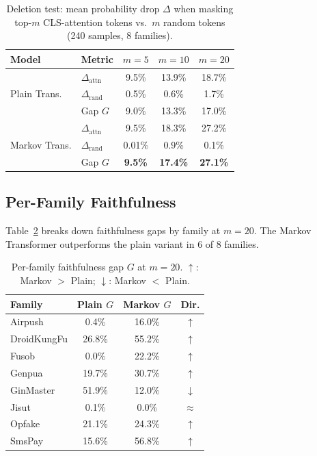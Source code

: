 \documentclass[12pt]{article}
\begin{document}
\begin{table}[t]
\centering
\caption{Deletion test: mean probability drop $\Delta$ when masking top-$m$
  CLS-attention tokens vs.\ $m$ random tokens (240 samples, 8 families).}
\label{tab:faithfulness}
\begin{tabular}{llccc}
\toprule
\textbf{Model} & \textbf{Metric} & $m{=}5$ & $m{=}10$ & $m{=}20$ \\
\midrule
\multirow{3}{*}{Plain Trans.}
  & $\Delta_{\text{attn}}$  & 9.5\%  & 13.9\%  & 18.7\% \\
  & $\Delta_{\text{rand}}$  & 0.5\%  &  0.6\%  &  1.7\% \\
  & Gap $G$                 & 9.0\%  & 13.3\%  & 17.0\% \\
\midrule
\multirow{3}{*}{Markov Trans.}
  & $\Delta_{\text{attn}}$  & 9.5\%  & 18.3\%  & 27.2\% \\
  & $\Delta_{\text{rand}}$  & 0.01\% &  0.9\%  &  0.1\% \\
  & Gap $G$                 & \textbf{9.5\%} & \textbf{17.4\%} & \textbf{27.1\%} \\
\bottomrule
\end{tabular}
\end{table}

\subsection{Per-Family Faithfulness}

Table~\ref{tab:perfamily} breaks down faithfulness gaps by family at
$m{=}20$. The Markov Transformer outperforms the plain variant in 6 of
8 families.

\begin{table}[t]
\centering
\caption{Per-family faithfulness gap $G$ at $m{=}20$.
  $\uparrow$: Markov $>$ Plain;\; $\downarrow$: Markov $<$ Plain.}
\label{tab:perfamily}
\begin{tabular}{lccc}
\toprule
\textbf{Family} & \textbf{Plain $G$} & \textbf{Markov $G$} & \textbf{Dir.} \\
\midrule
Airpush      &  0.4\% &  16.0\% & $\uparrow$ \\
DroidKungFu  & 26.8\% &  55.2\% & $\uparrow$ \\
Fusob        &  0.0\% &  22.2\% & $\uparrow$ \\
Genpua       & 19.7\% &  30.7\% & $\uparrow$ \\
GinMaster    & 51.9\% &  12.0\% & $\downarrow$ \\
Jisut        &  0.1\% &   0.0\% & $\approx$ \\
Opfake       & 21.1\% &  24.3\% & $\uparrow$ \\
SmsPay       & 15.6\% &  56.8\% & $\uparrow$ \\
\bottomrule
\end{tabular}
\end{table}
\end{document}
